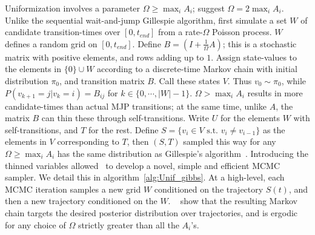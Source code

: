 Uniformization involves a parameter 
$\Omega \ge \max_i A_i$; \cite{RaoTeh13} suggest $\Omega = 2 \max_i A_i$. 
Unlike the sequential wait-and-jump Gillespie algorithm, first simulate 
a set $W$ of candidate
transition-times over $[0,t_{end}]$ from a rate-$\Omega$ 
Poisson process. $W$ %
defines a random grid on $[0,t_{end}]$.
Define $B = \left(I +\frac{1}{\Omega}A\right)$; this is a
stochastic matrix with positive elements, and rows adding up to $1$.
Assign state-values to the elements in $\{0\} \cup W$ according to a discrete-time 
Markov chain with initial distribution $\pi_0$, and transition matrix $B$.
Call these states $V$. Thus $v_0 \sim \pi_0$, while $P(v_{k+1}=j|v_k=i) = B_{ij}$
for $k \in \{0,\cdots,|W|-1\}$.
$\Omega > \max_i A_i$ results in more
candidate-times than actual MJP transitions; at the same time, unlike $A$, 
the matrix $B$ can thin these through self-transitions. Write $U$ for 
the elements $W$ with self-transitions, and $T$ for the rest.
Define $S=\{v_i \in V \text{ s.t.\ } v_i \neq v_{i-1}\}$
as the elements in $V$ corresponding to $T$, then $(S,T)$
sampled this way for any $\Omega \ge \max_i A_i$
has the same distribution as Gillespie's algorithm~\citep{Jen1953,RaoTeh13}.
Introducing the thinned variables allowed~\cite{RaoTeh13} to develop
a novel, simple and efficient MCMC sampler. We detail this in algorithm~\ref{alg:Unif_gibbs}. At a 
high-level, each MCMC iteration 
samples a new grid $W$ conditioned on the trajectory $S(t)$, 
and then a new trajectory conditioned on the $W$. 
    ~\cite{RaoTeh13} show that the resulting Markov chain targets
    the desired posterior distribution over trajectories, and is 
    ergodic for any choice of $\Omega$ strictly greater than all the
    $A_i$'s. 
